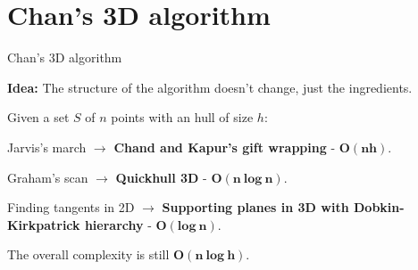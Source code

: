 \documentclass[14pt, handout]{beamer}
\begin{document}
\section{Chan's 3D algorithm}
\begin{frame}{Chan's 3D algorithm}
	\begin{center}
		\vspace{-2mm}
		\begin{fullpageitemize}
			\item<1->[\rtarrow] \textbf{Idea:} The structure of the algorithm doesn't change, just the ingredients.
			
			\fontsize{12}{14}\notosansfont
			\begin{sublist}
				\vspace{2mm}
				\item<2->[] Given a set $S$ of $n$ points with an hull of size $h$:
				\vspace{2mm}
				\item<3-> Jarvis's march $\longrightarrow$ \textbf{Chand and Kapur's gift wrapping} - \textcolor{colorgreen}{$\bm{O(nh)}$}.
				\item<4-> Graham's scan $\longrightarrow$ \textbf{Quickhull 3D} - \textcolor{colorgreen}{$\bm{O(n\ log\ n)}$}.
				\item<5-> Finding tangents in 2D $\longrightarrow$ \textbf{Supporting planes in 3D with Dobkin-Kirkpatrick hierarchy} - \textcolor{colorgreen}{$\bm{O(log\ n)}$}.
			\end{sublist}		
			
			\item<6-> The overall complexity is still \textcolor{colorgreen}{$\bm{O(n\ log\ h)}$}.
		\end{fullpageitemize}	
	\end{center}
\end{frame}
\end{document}
